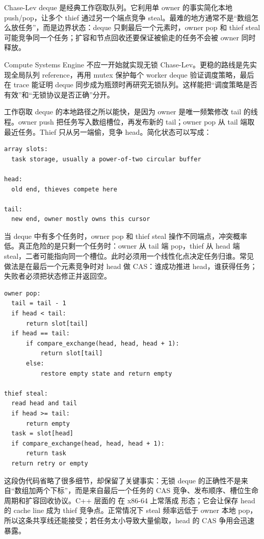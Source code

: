 Chase-Lev deque 是经典工作窃取队列。它利用单 owner 的事实简化本地 push/pop，让多个 thief 通过另一个端点竞争 steal。最难的地方通常不是“数组怎么放任务”，而是边界状态：deque 只剩最后一个元素时，owner pop 和 thief steal 可能竞争同一个任务；扩容和节点回收还要保证被偷走的任务不会被 owner 同时释放。

Compute Systems Engine 不应一开始就实现无锁 Chase-Lev。更稳的路线是先实现全局队列 reference，再用 mutex 保护每个 worker deque 验证调度策略，最后在 trace 能证明 deque 同步成为瓶颈时再研究无锁队列。这样能把“调度策略是否有效”和“无锁协议是否正确”分开。

工作窃取 deque 的本地路径之所以能快，是因为 owner 是唯一频繁修改 tail 的线程。owner push 把任务写入数组槽位，再发布新的 tail；owner pop 从 tail 端取最近任务。Thief 只从另一端偷，竞争 head。简化状态可以写成：

\begin{lstlisting}[numbers=none,caption={工作窃取 deque 的关键状态}]
array slots:
  task storage, usually a power-of-two circular buffer

head:
  old end, thieves compete here

tail:
  new end, owner mostly owns this cursor
\end{lstlisting}

当 deque 中有多个任务时，owner pop 和 thief steal 操作不同端点，冲突概率低。真正危险的是只剩一个任务时：owner 从 tail 端 pop，thief 从 head 端 steal，二者可能指向同一个槽位。此时必须用一个线性化点决定任务归谁。常见做法是在最后一个元素竞争时对 head 做 CAS：谁成功推进 head，谁获得任务；失败者必须把状态修正并返回空。

\begin{lstlisting}[numbers=none,caption={最后一个任务竞争的语义伪代码}]
owner pop:
  tail = tail - 1
  if head < tail:
      return slot[tail]
  if head == tail:
      if compare_exchange(head, head, head + 1):
          return slot[tail]
      else:
          restore empty state and return empty

thief steal:
  read head and tail
  if head >= tail:
      return empty
  task = slot[head]
  if compare_exchange(head, head, head + 1):
      return task
  return retry or empty
\end{lstlisting}

这段伪代码省略了很多细节，却保留了关键事实：无锁 deque 的正确性不是来自“数组加两个下标”，而是来自最后一个任务的 CAS 竞争、发布顺序、槽位生命周期和扩容回收协议。C++ 层面的  在 x86-64 上常落成  形态；它会让保存 head 的 cache line 成为 thief 竞争点。正常情况下 steal 频率远低于 owner 本地 pop，所以这条共享线还能接受；若任务太小导致大量偷取，head 的 CAS 争用会迅速暴露。

